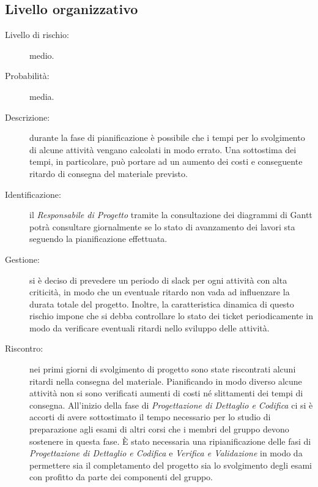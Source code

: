 \subsection{Livello organizzativo}
\begin{description}
	\item[Livello di rischio:] medio.
	\item[Probabilità:] media.
	\item[Descrizione:] durante la fase di pianificazione è possibile che i tempi per lo svolgimento di alcune attività vengano calcolati in modo errato. Una sottostima dei tempi, in particolare, può portare ad un aumento dei costi e conseguente ritardo di consegna del materiale previsto. 
	\item[Identificazione:] il \textit{Responsabile di Progetto} tramite la consultazione dei diagrammi di \gls{Gantt} potrà consultare giornalmente se lo stato di avanzamento dei lavori sta seguendo la pianificazione effettuata.
	\item[Gestione:] si è deciso di prevedere un periodo di \gls{slack} per ogni attività con alta criticità, in modo che un eventuale ritardo non vada ad influenzare la durata totale del progetto. Inoltre, la caratteristica dinamica di questo rischio impone che si debba controllare lo stato dei \gls{ticket} periodicamente in modo da verificare eventuali ritardi nello sviluppo delle attività. 
	\item[Riscontro:] nei primi giorni di svolgimento di progetto sono state riscontrati alcuni ritardi nella consegna del materiale. Pianificando in modo diverso alcune attività non si sono verificati aumenti di costi né slittamenti dei tempi di consegna. All'inizio della fase di \textit{Progettazione di Dettaglio e Codifica} ci si è accorti di avere sottostimato il tempo necessario per lo studio di preparazione agli esami di altri corsi che i membri del gruppo devono sostenere in questa fase. È stato necessaria una ripianificazione delle fasi di \textit{Progettazione di Dettaglio e Codifica} e \textit{Verifica e Validazione} in modo da permettere sia il completamento del progetto sia lo svolgimento degli esami con profitto da parte dei componenti del gruppo. 
\end{description}


